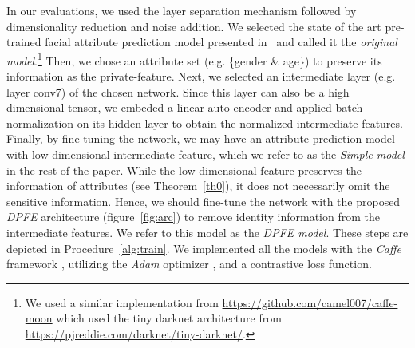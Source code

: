 \documentclass[10pt,journal,compsoc]{IEEEtran}
\begin{document}
In our evaluations, we used the layer separation mechanism followed by dimensionality reduction and noise addition. We selected the state of the art pre-trained facial attribute prediction model presented in~\cite{rudd2016} and called it the \emph{original model}.\footnote{We used a similar implementation from \url{https://github.com/camel007/caffe-moon} which used the tiny darknet architecture from \url{https://pjreddie.com/darknet/tiny-darknet/}.} Then, we chose an attribute set (e.g. \{gender \& age\}) to preserve its information as the private-feature. Next, we selected an intermediate layer (e.g. layer conv7) of the chosen network. Since this layer can also be a high dimensional tensor, we embeded a linear auto-encoder and applied batch normalization on its hidden layer to obtain the normalized intermediate features. Finally, by fine-tuning the network, we may have an attribute prediction model with low dimensional intermediate feature, which we refer to as the \emph{Simple model} in the rest of the paper.
While the low-dimensional feature preserves the information of attributes (see Theorem~\ref{th0}), it does not necessarily omit the sensitive information. Hence, we should fine-tune the network with the proposed \emph{DPFE} architecture (figure~\ref{fig:arc}) to remove identity information from the intermediate features. We refer to this model as the \emph{DPFE model}. These steps are depicted in Procedure~\ref{alg:train}. We implemented all the models with the \emph{Caffe} framework \cite{jia2014caffe}, utilizing the \emph{Adam} optimizer \cite{kingma2014}, and a contrastive loss function. 
\end{document}
